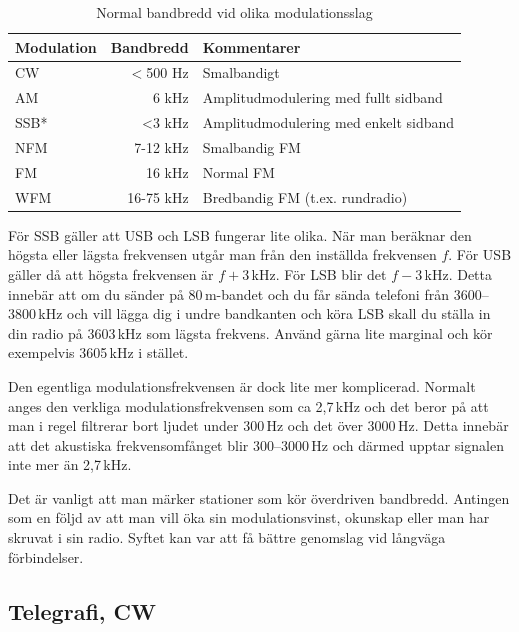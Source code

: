 \begin{table}[H]
\centering
\begin{tabular}{lrl}
	\textbf{Modulation} & \textbf{Bandbredd} & \textbf{Kommentarer}                  \\ \hline
	CW                  &          $<$500 Hz & Smalbandigt                           \\
	AM                  &              6 kHz & Amplitudmodulering med fullt sidband  \\
	SSB*                &              <3 kHz & Amplitudmodulering med enkelt sidband \\
	NFM                 &           7-12 kHz & Smalbandig FM                         \\
	FM                  &             16 kHz & Normal FM                             \\
	WFM                 &          16-75 kHz & Bredbandig FM (t.ex. rundradio)
\end{tabular}
\caption{Normal bandbredd vid olika modulationsslag}
\end{table}

För SSB gäller att USB och LSB fungerar lite olika. När man beräknar den
högsta eller lägsta frekvensen utgår man från den inställda frekvensen $f$.
För USB gäller då att högsta frekvensen är $f+3$\,kHz. För LSB blir det
$f-3$\,kHz. Detta innebär att om du sänder på 80\,m-bandet och du får sända
telefoni från 3600--3800\,kHz och vill lägga dig i undre bandkanten och köra
LSB skall du ställa in din radio på 3603\,kHz som lägsta frekvens. Använd
gärna lite marginal och kör exempelvis 3605\,kHz i stället.

Den egentliga modulationsfrekvensen är dock lite mer komplicerad. Normalt
anges den verkliga modulationsfrekvensen som ca 2,7\,kHz och det beror på att
man i regel filtrerar bort ljudet under 300\,Hz och det över 3000\,Hz. Detta
innebär att det akustiska frekvensomfånget blir 300--3000\,Hz och därmed
upptar signalen inte mer än 2,7\,kHz.

Det är vanligt att man märker stationer som kör överdriven bandbredd. Antingen
som en följd av att man vill öka sin modulationsvinst, okunskap eller man har
skruvat i sin radio. Syftet kan var att få bättre genomslag vid långväga
förbindelser.

\subsection{Telegrafi, CW}

